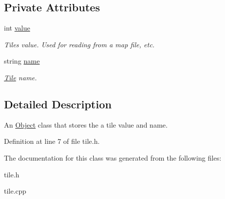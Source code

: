 \subsection*{Private Attributes}
\begin{DoxyCompactItemize}
\item 
int \hyperlink{classTile_abc4813aabaaf0451b10bb45ed713bc7e}{value}\hypertarget{classTile_abc4813aabaaf0451b10bb45ed713bc7e}{}\label{classTile_abc4813aabaaf0451b10bb45ed713bc7e}

\begin{DoxyCompactList}\small\item\em Tiles value. Used for reading from a map file, etc. \end{DoxyCompactList}\item 
string \hyperlink{classTile_a2c6344b40ed121b8fc4f17bc4b398c37}{name}\hypertarget{classTile_a2c6344b40ed121b8fc4f17bc4b398c37}{}\label{classTile_a2c6344b40ed121b8fc4f17bc4b398c37}

\begin{DoxyCompactList}\small\item\em \hyperlink{classTile}{Tile} name. \end{DoxyCompactList}\end{DoxyCompactItemize}


\subsection{Detailed Description}
An \hyperlink{classObject}{Object} class that stores the a tile value and name. 

Definition at line 7 of file tile.\+h.



The documentation for this class was generated from the following files\+:\begin{DoxyCompactItemize}
\item 
tile.\+h\item 
tile.\+cpp\end{DoxyCompactItemize}
